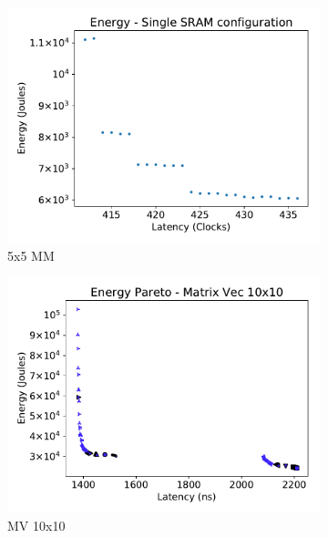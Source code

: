 \begin{figure}[ht]
\centering
\begin{subfigure}{.33\textwidth}
  \centering
  \includegraphics[width=\textwidth]{graphs/energy_plot_single_sram_v3.pdf}
  \caption{5x5 MM}
  \label{fig:single_sram}
\end{subfigure}%
\begin{subfigure}{.33\textwidth}
  \centering
  \includegraphics[width=\textwidth]{graphs/EnergyParetoMatrixVec10_v3.pdf}
  \caption{MV 10x10}
  \label{fig:sram_vs_mram_pareto_vec}
\end{subfigure}
\begin{subfigure}{.33\textwidth}
  \centering

\end{subfigure}
\end{figure}
